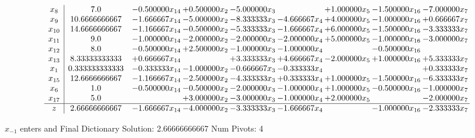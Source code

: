 \documentclass[10pt]{article}
\begin{document}
 \[\begin{array}{c| c c@{\hskip 2pt} c@{\hskip 2pt} c@{\hskip 2pt} c@{\hskip 2pt} c@{\hskip 2pt} c@{\hskip 2pt} c@{\hskip 2pt} }
 x_{8}   &  7.0 & -0.500000 x_{14} & + 0.500000 x_{2} & -5.000000 x_{3} &   & + 1.000000 x_{5} & -1.500000 x_{16} & -7.000000 x_{7}\\
 x_{9}   &  10.6666666667 & -1.666667 x_{14} & -5.000000 x_{2} & -8.333333 x_{3} & -4.666667 x_{4} & + 4.000000 x_{5} & -1.000000 x_{16} & + 0.666667 x_{7}\\
 x_{10}   &  14.6666666667 & -1.166667 x_{14} & -0.500000 x_{2} & -5.333333 x_{3} & -1.666667 x_{4} & + 6.000000 x_{5} & -1.500000 x_{16} & -3.333333 x_{7}\\
 x_{11}   &  9.0 & -1.000000 x_{14} & -2.000000 x_{2} & -2.000000 x_{3} & -2.000000 x_{4} & + 5.000000 x_{5} & -1.000000 x_{16} & -3.000000 x_{7}\\
 x_{12}   &  8.0 & -0.500000 x_{14} & + 2.500000 x_{2} & -1.000000 x_{3} & -1.000000 x_{4} &   & -0.500000 x_{16} &   \\
 x_{13}   &  8.33333333333 & + 0.666667 x_{14} &   & + 3.333333 x_{3} & + 4.666667 x_{4} & -2.000000 x_{5} & + 1.000000 x_{16} & + 5.333333 x_{7}\\
 x_{1}   &  0.333333333333 & -0.333333 x_{14} & -1.000000 x_{2} & -0.666667 x_{3} & -0.333333 x_{4} &    &   & + 0.333333 x_{7}\\
 x_{15}   &  12.6666666667 & -1.166667 x_{14} & -2.500000 x_{2} & -4.333333 x_{3} & + 0.333333 x_{4} & + 1.000000 x_{5} & -1.500000 x_{16} & -6.333333 x_{7}\\
 x_{6}   &  1.0 & -0.500000 x_{14} & -0.500000 x_{2} & -2.000000 x_{3} & -1.000000 x_{4} & + 1.000000 x_{5} & -0.500000 x_{16} & -1.000000 x_{7}\\
 x_{17}   &  5.0  &   & + 3.000000 x_{2} & -3.000000 x_{3} & -1.000000 x_{4} & + 2.000000 x_{5} &   & -2.000000 x_{7}\\
\hline
z    &  2.66666666667 & -1.666667 x_{14} & -4.000000 x_{2} & -3.333333 x_{3} & -1.666667 x_{4} &   & -1.000000 x_{16} & -2.333333 x_{7}\\
\end{array}\]


 $ x_{-1} $ enters and Final Dictionary
Solution:  2.66666666667
Num Pivots:  4
\end{document}
